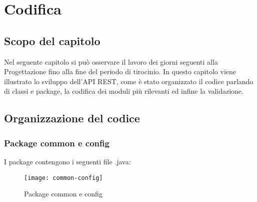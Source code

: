 \chapter{Codifica}
\label{cap:codifica}

\section{Scopo del capitolo}
Nel seguente capitolo si può osservare il lavoro dei giorni seguenti alla Progettazione fino alla fine del periodo di tirocinio. In questo capitolo viene illustrato lo sviluppo dell'API REST, come è stato organizzato il codice parlando di classi e package, la codifica dei moduli più rilevanti ed infine la validazione. \\



\section{Organizzazione del codice}
\subsection{Package common e config}
I package contengono i seguenti file .java:

\begin{figure}[H] 
    \centering 
    \texttt{[image: common-config]} 
    \caption{Package common e config}
\end{figure}











